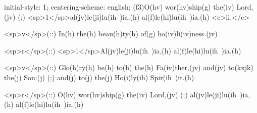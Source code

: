 initial-style: 1;
centering-scheme: english;
(f3)O(hv) wor(hv)ship(g) the(iv) Lord,(jv) (;) <sp>1</sp>al(jv)le(ji)lu(ih~)ia,(h) al(f)le(hi)lu(ih~)ia.(h) <c>ii.</c>

<sp>v</sp>(::) In(h) the(h) beau(h)ty(h) of(g) ho(iv)li(iv)ness.(jv)

<sp>r</sp>(::) <sp>1</sp>Al(jv)le(ji)lu(ih~)ia,(h) al(f)le(hi)lu(ih~)ia.(h)

<sp>v</sp>(::) Glo(h)ry(h) be(h) to(h) the(h) Fa(iv)ther,(jv) and(jv) to(kxjk) the(j) Son:(j) (;) and(j) to(j) the(j) Ho(i)ly(ih) Spir(ih~)it.(h)

<sp>r</sp>(::) O(hv) wor(hv)ship(g) the(iv) Lord,(jv) (;) al(jv)le(ji)lu(ih~)ia,(h) al(f)le(hi)lu(ih~)ia.(h)